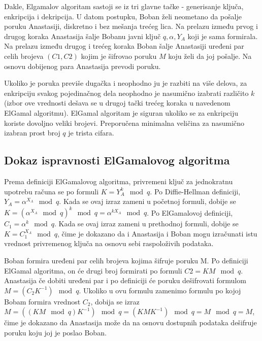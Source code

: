 \documentclass[a4paper]{article}
\begin{document}
 Dakle, Elgamalov algoritam sastoji se iz tri glavne tačke - generisanje ključa, enkripcija i dekripcija. U datom postupku, Boban želi neometano da pošalje poruku Anastasiji, diskretno i bez mešanja trećeg lica. Na prelazu između prvog i drugog koraka Anastasija šalje Bobanu javni ključ ${q,\alpha,Y_A}$ koji je sama formirala. Na prelazu između drugog i trećeg koraka Boban šalje Anastasiji uređeni par celih brojeva $(C1,C2)$ kojim je šifrovao poruku $M$ koju želi da joj pošalje. Na osnovu dobijenog para Anastasija prevodi poruku. 
 
 Ukoliko je poruka previše dugačka i neophodno ju je razbiti na više delova, za enkripciju svakog pojedinačnog dela neophodno je nasumično izabrati različito $k$ (izbor ove vrednosti dešava se u drugoj tački trećeg koraka u navedenom ElGamal algoritmu). ElGamal algoritam je siguran ukoliko se za enkripciju koriste dovoljno veliki brojevi. Preporučena minimalna veličina za nasumično izabran prost broj $q$ je trista cifara.

\subsection{Dokaz ispravnosti ElGamalovog algoritma}
Prema definiciji ElGamalovog algoritma, privremeni ključ za jednokratnu upotrebu računa se po formuli $K=Y_A^k\mod q$. Po Diffie-Hellman definiciji, $Y_A=\alpha^{X_A}\mod q$. Kada se ovaj izraz zameni u početnoj formuli, dobije se $K=(\alpha^{X_A}\mod q)^k\mod q =\alpha^{kX_A}\mod q$. Po ElGamalovoj definiciji, $C_1=\alpha^k\mod q$. Kada se ovaj izraz zameni u prethodnoj formuli, dobije se $K=C_1^{X_A}\mod q$, čime je dokazano da i Anastasija i Boban mogu izračunati istu vrednost privremenog ključa na osnovu sebi raspoloživih podataka.

Boban formira uređeni par celih brojeva kojima šifruje poruku M. Po definiciji ElGamal algoritma, on će drugi broj formirati po formuli $C2=KM\mod q$. Anastasija če dobiti uređeni par i po definiciji će poruku dešifrovati formulom $M=(C_2K^{-1})\mod q$. Ukoliko u ovu formulu zamenimo formulu po kojoj Bobam formira vrednost $C_2$, dobija se izraz $M=((KM\mod q)K^{-1})\mod q=(KMK^{-1})\mod q=M\mod q=M$, čime je dokazano da Anastasija može da na osnovu dostupnih podataka dešifruje poruku koju joj je poslao Boban.
\end{document}
